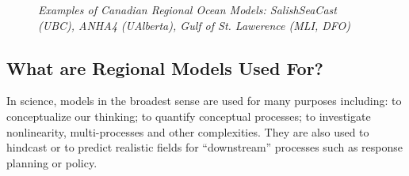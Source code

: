 \documentclass[letterpaper,12pt]{article}
\begin{document}
\begin{figure}[h]
\noindent{}
\caption{\protect\it{\small Examples of Canadian Regional Ocean Models: SalishSeaCast (UBC), ANHA4 (UAlberta), Gulf of St. Lawerence (MLI, DFO)}}
\label{plt:examples}
\end{figure}
  
\subsection{What are Regional Models Used For?}

In science, models in the broadest sense are used for many purposes including: to conceptualize our thinking; to quantify conceptual processes; to investigate nonlinearity, multi-processes and other complexities.  They are also used to hindcast or to predict realistic fields for ``downstream'' processes such as response planning or policy.
\end{document}
